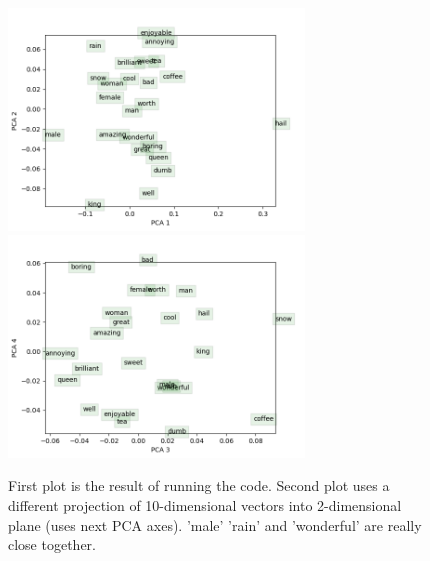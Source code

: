 \documentclass{article}
\begin{document}
\begin{enumerate}[label=(\alph*)]
\begin{figure}[h]
	\centering
	\includegraphics[width=0.7\textwidth]{word_vectors.png}
	\includegraphics[width=0.7\textwidth]{word_vectors_2.png}
	\caption{First plot is the result of running the code. Second plot uses a different projection of 10-dimensional vectors into 2-dimensional plane (uses next PCA axes). 'male' 'rain' and 'wonderful' are really close together.}
	\label{fig:word_vec}
\end{figure}



\end{enumerate}
\end{document}
